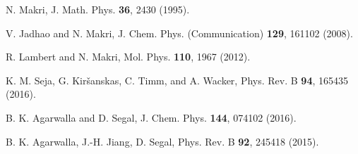 \documentclass[aps,pra,twocolumn,groupedaddress,showpacs,superscriptaddress,amssymb,amsmath]{revtex4-1}
\begin{document}
\begin{thebibliography}{0}


N. Makri, 
J. Math. Phys.  {\bf 36}, 2430 (1995). 
%

V. Jadhao and N. Makri, 
J. Chem. Phys. (Communication) {\bf 129}, 161102 (2008).

R.  Lambert  and  N.  Makri,  
Mol.  Phys. {\bf 110}, 1967 (2012). 


K. M. Seja, G. Kiršanskas, C. Timm, and A. Wacker,
Phys. Rev. B {\bf 94}, 165435 (2016).
% 



B. K. Agarwalla and D. Segal,
J. Chem.  Phys. {\bf 144}, 074102 (2016).


B. K. Agarwalla, J.-H. Jiang, D. Segal, Phys. Rev. B {\bf 92}, 245418 (2015).






\end{thebibliography}
 
\end{document}
